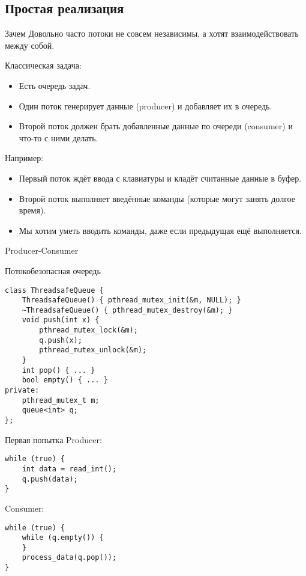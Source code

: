 \subsection{Простая реализация}

\begin{frame}{Зачем}
	Довольно часто потоки не совсем независимы, а хотят взаимодействовать между собой.

	Классическая задача:
	\begin{itemize}
		\item Есть очередь задач.
		\item Один поток генерирует данные (producer) и добавляет их в очередь.
		\item Второй поток должен брать добавленные данные по очереди (consumer) и что-то с ними делать.
	\end{itemize}
	Например:
	\begin{itemize}
		\item Первый поток ждёт ввода с клавиатуры и кладёт считанные данные в буфер.
		\item Второй поток выполняет введённые команды (которые могут занять долгое время).
		\item Мы хотим уметь вводить команды, даже если предыдущая ещё выполняется.
	\end{itemize}
\end{frame}

\begin{frame}{Producer-Consumer}
\end{frame}

\begin{frame}[fragile]{Потокобезопасная очередь}
\begin{verbatim}
class ThreadsafeQueue {
    ThreadsafeQueue() { pthread_mutex_init(&m, NULL); }
    ~ThreadsafeQueue() { pthread_mutex_destroy(&m); }
    void push(int x) {
        pthread_mutex_lock(&m);
        q.push(x);
        pthread_mutex_unlock(&m);
    }
    int pop() { ... }
    bool empty() { ... }
private:
    pthread_mutex_t m;
    queue<int> q;
};
\end{verbatim}
\end{frame}

\begin{frame}[fragile]{Первая попытка}
	Producer:
\begin{verbatim}
while (true) {
    int data = read_int();
    q.push(data);
}
\end{verbatim}
	Consumer:
	\pause
\begin{verbatim}
while (true) {
    while (q.empty()) {
    }
    process_data(q.pop());
}
\end{verbatim}
\end{frame}

